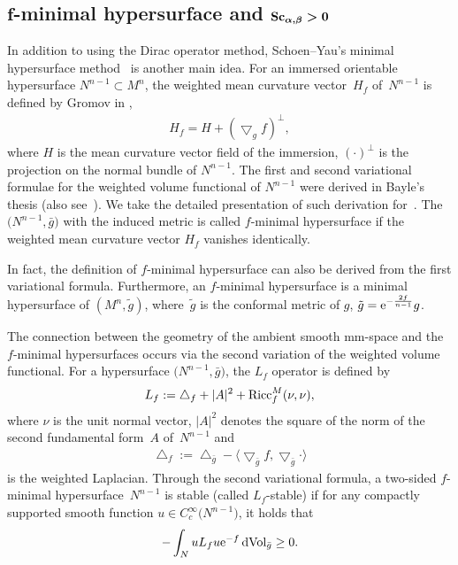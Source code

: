 \documentclass[pdftex]{sigma}
\begin{document}
\subsection[f-minimal hypersurface and Sc(alpha,beta)>0]{$\boldsymbol{f}$-minimal hypersurface and $\boldsymbol{{\rm Sc}_{\alpha, \beta}>0}$}

In addition to using the Dirac operator method, Schoen--Yau's minimal hypersurface method~\cite{MR541332} is another main idea. For an immersed orientable hypersurface $N^{n-1}\subset M^n$, the weighted mean curvature vector~$H_f$ of~$N^{n-1}$ is defined by Gromov in \cite[Section~9.4.E]{MR1978494},
\begin{gather*}
H_f= H+ (\bigtriangledown_gf)^{\perp},
\end{gather*}
 where $H$ is the mean curvature vector field of the immersion, $(\cdot)^{\perp}$ is the projection on the normal bundle of $N^{n-1}$. The first and second variational formulae for the weighted volume functional of $N^{n-1}$ were derived in Bayle's thesis (also see~\cite{MR2342613}). We take the detailed presentation of such derivation for~\cite{MR3324919}. The $\big(N^{n-1}, \bar{g}\big)$ with the induced metric is called $f$-minimal hypersurface if the weighted mean curvature vector $H_f$ vanishes identically.

 In fact, the definition of $f$-minimal hypersurface can also be derived from the first variational formula. Furthermore, an $f$-minimal hypersurface is a minimal hypersurface of $(M^n, \tilde{g})$, where~$\tilde{g}$ is the conformal metric of $g$, $\tilde{g}={\rm e}^{-\frac{2f}{n-1}}g$.

The connection between the geometry of the ambient smooth mm-space and the $f$-minimal hypersurfaces occurs via the second variation of the weighted volume functional. For a hypersurface $\big(N^{n-1}, \bar{g}\big)$, the $L_f$ operator is defined by
\begin{gather*}
L_f:= \bigtriangleup_f + |A|^2 + {\rm Ricc}^M_f(\nu, \nu),
\end{gather*}
 where $\nu$ is the unit normal vector, $|A|^2$ denotes the square of the norm of the second fundamental form~$A$ of~$N^{n-1}$ and
\begin{gather*}
 \bigtriangleup_f:=\bigtriangleup_{\bar{g}} - \langle\bigtriangledown_{\bar{g}}f, \bigtriangledown_{\bar{g}}\cdot\rangle
\end{gather*}
is the weighted Laplacian. Through the second variational formula, a two-sided $f$-minimal hypersurface~$N^{n-1}$ is stable (called $L_f$-stable) if for any compactly supported smooth function $u\in C^{\infty}_c\big(N^{n-1}\big)$, it holds that
\begin{gather*}
 -\int_NuL_fu {\rm e}^{-f}\,{\rm dVol}_{\bar{g}}\geq 0.
\end{gather*}
\end{document}
